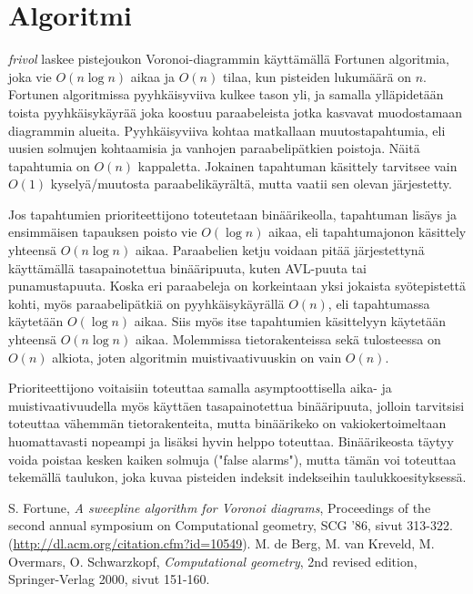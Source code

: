 \documentclass[a4paper, 11pt, finnish]{article}
\begin{document}
\section*{Algoritmi}
\emph{frivol} laskee pistejoukon Voronoi-diagrammin käyttämällä Fortunen algoritmia, joka vie $O(n \log n)$ aikaa ja $O(n)$ tilaa, kun pisteiden lukumäärä on $n$. Fortunen algoritmissa pyyhkäisyviiva kulkee tason yli, ja samalla ylläpidetään toista pyyhkäisykäyrää joka koostuu paraabeleista jotka kasvavat muodostamaan diagrammin alueita. Pyyhkäisyviiva kohtaa matkallaan muutostapahtumia, eli uusien solmujen kohtaamisia ja vanhojen paraabelipätkien poistoja. Näitä tapahtumia on $O(n)$ kappaletta. Jokainen tapahtuman käsittely tarvitsee vain $O(1)$ kyselyä/muutosta paraabelikäyrältä, mutta vaatii sen olevan järjestetty.\cite{fortunepaperi}\cite{compgeomkirja}

Jos tapahtumien prioriteettijono toteutetaan binäärikeolla, tapahtuman lisäys ja ensimmäisen tapauksen poisto vie $O(\log n)$ aikaa, eli tapahtumajonon käsittely yhteensä $O(n \log n)$ aikaa. Paraabelien ketju voidaan pitää järjestettynä käyttämällä tasapainotettua binääripuuta, kuten AVL-puuta tai punamustapuuta. Koska eri paraabeleja on korkeintaan yksi jokaista syötepistettä kohti, myös paraabelipätkiä on pyyhkäisykäyrällä $O(n)$, eli tapahtumassa käytetään $O(\log n)$ aikaa. Siis myös itse tapahtumien käsittelyyn käytetään yhteensä $O(n \log n)$ aikaa. Molemmissa tietorakenteissa sekä tulosteessa\cite{fortunepaperi} on $O(n)$ alkiota, joten algoritmin muistivaativuuskin on vain $O(n)$.

Prioriteettijono voitaisiin toteuttaa samalla asymptoottisella aika- ja muistivaativuudella myös käyttäen tasapainotettua binääripuuta, jolloin tarvitsisi toteuttaa vähemmän tietorakenteita, mutta binäärikeko on vakiokertoimeltaan huomattavasti nopeampi ja lisäksi hyvin helppo toteuttaa. Binäärikeosta täytyy voida poistaa kesken kaiken solmuja ("false alarms"\cite{compgeomkirja}), mutta tämän voi toteuttaa tekemällä taulukon, joka kuvaa pisteiden indeksit indekseihin taulukkoesityksessä.

\begin{thebibliography}{9}
 S. Fortune, \emph{A sweepline algorithm for Voronoi diagrams}, Proceedings of the second annual symposium on Computational geometry, SCG '86, sivut 313-322. (\url{http://dl.acm.org/citation.cfm?id=10549}).
 M. de Berg, M. van Kreveld, M. Overmars, O. Schwarzkopf, \emph{Computational geometry}, 2nd revised edition, Springer-Verlag 2000, sivut 151-160.
\end{thebibliography}
\end{document}
